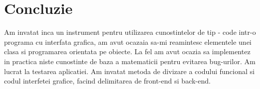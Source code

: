 \section*{Concluzie}


Am invatat inca un instrument pentru utilizarea cunostintelor de tip - code intr-o programa cu interfata grafica, am avut ocazaia sa-mi reamintesc elementele unei clasa si programarea orientata pe obiecte. La fel am avut ocazia sa implementez in practica niste cunostinte de baza a matematicii pentru evitarea bug-urilor. Am lucrat la testarea aplicatiei. Am invatat metoda de divizare a codului funcional si codul interfetei grafice, facind delimitarea de front-end si back-end.

\clearpage